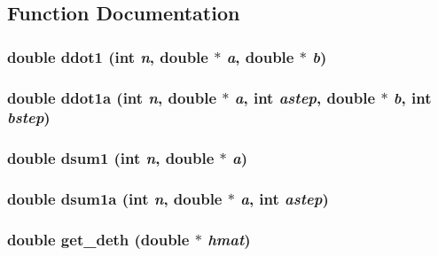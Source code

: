 \subsection{Function Documentation}
\subsubsection{\setlength{\rightskip}{0pt plus 5cm}double ddot1 (int {\em n}, double $\ast$ {\em a}, double $\ast$ {\em b})}\label{md__mathlib_8c_04f9ace366a5d3f8c2bc505269d220b5}


\subsubsection{\setlength{\rightskip}{0pt plus 5cm}double ddot1a (int {\em n}, double $\ast$ {\em a}, int {\em astep}, double $\ast$ {\em b}, int {\em bstep})}\label{md__mathlib_8c_2e4408dba3a60d5cfa61bf07c935c049}


\subsubsection{\setlength{\rightskip}{0pt plus 5cm}double dsum1 (int {\em n}, double $\ast$ {\em a})}\label{md__mathlib_8c_37015c4294d61ebff20245e3ff83638d}


\subsubsection{\setlength{\rightskip}{0pt plus 5cm}double dsum1a (int {\em n}, double $\ast$ {\em a}, int {\em astep})}\label{md__mathlib_8c_9103b8e1c1802d9301c6fae0be266d3f}


\subsubsection{\setlength{\rightskip}{0pt plus 5cm}double get\_\-deth (double $\ast$ {\em hmat})}\label{md__mathlib_8c_0a4a22a048524d5041266aa8dc1f04a8}


